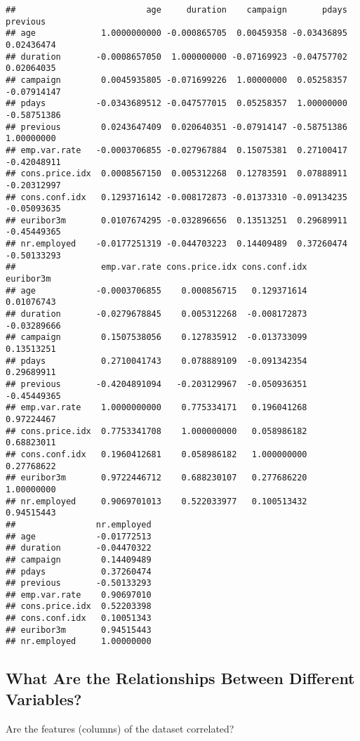 \documentclass[
]{article}
\begin{document}
\begin{verbatim}
##                          age     duration    campaign       pdays    previous
## age             1.0000000000 -0.000865705  0.00459358 -0.03436895  0.02436474
## duration       -0.0008657050  1.000000000 -0.07169923 -0.04757702  0.02064035
## campaign        0.0045935805 -0.071699226  1.00000000  0.05258357 -0.07914147
## pdays          -0.0343689512 -0.047577015  0.05258357  1.00000000 -0.58751386
## previous        0.0243647409  0.020640351 -0.07914147 -0.58751386  1.00000000
## emp.var.rate   -0.0003706855 -0.027967884  0.15075381  0.27100417 -0.42048911
## cons.price.idx  0.0008567150  0.005312268  0.12783591  0.07888911 -0.20312997
## cons.conf.idx   0.1293716142 -0.008172873 -0.01373310 -0.09134235 -0.05093635
## euribor3m       0.0107674295 -0.032896656  0.13513251  0.29689911 -0.45449365
## nr.employed    -0.0177251319 -0.044703223  0.14409489  0.37260474 -0.50133293
##                 emp.var.rate cons.price.idx cons.conf.idx   euribor3m
## age            -0.0003706855    0.000856715   0.129371614  0.01076743
## duration       -0.0279678845    0.005312268  -0.008172873 -0.03289666
## campaign        0.1507538056    0.127835912  -0.013733099  0.13513251
## pdays           0.2710041743    0.078889109  -0.091342354  0.29689911
## previous       -0.4204891094   -0.203129967  -0.050936351 -0.45449365
## emp.var.rate    1.0000000000    0.775334171   0.196041268  0.97224467
## cons.price.idx  0.7753341708    1.000000000   0.058986182  0.68823011
## cons.conf.idx   0.1960412681    0.058986182   1.000000000  0.27768622
## euribor3m       0.9722446712    0.688230107   0.277686220  1.00000000
## nr.employed     0.9069701013    0.522033977   0.100513432  0.94515443
##                nr.employed
## age            -0.01772513
## duration       -0.04470322
## campaign        0.14409489
## pdays           0.37260474
## previous       -0.50133293
## emp.var.rate    0.90697010
## cons.price.idx  0.52203398
## cons.conf.idx   0.10051343
## euribor3m       0.94515443
## nr.employed     1.00000000
\end{verbatim}

\subsection{What Are the Relationships Between Different
Variables?}\label{what-are-the-relationships-between-different-variables}

Are the features (columns) of the dataset correlated?
\end{document}
